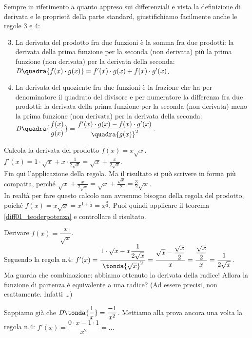 Sempre in riferimento a quanto appreso sui differenziali 
e vista la definizione di derivata e le proprietà della parte standard, 
giustifichiamo facilmente anche le regole 3 e 4:
\begin{enumerate}[noitemsep]
\setcounter{enumi}{2}
\item La derivata del prodotto fra due funzioni è la somma fra due prodotti:
la derivata della prima funzione per la seconda (non derivata) più la prima 
funzione (non derivata) per la derivata della seconda:\\
$\mathit{D}\quadra{f(x)\cdot g(x)}=f'(x)\cdot g(x)+f(x)\cdot g'(x)$.
\item La derivata del quoziente fra due funzioni è la frazione che ha per 
denominatore il quadrato del divisore e per numeratore la differenza fra due
prodotti: la derivata della prima funzione per la seconda (non derivata) meno
la prima funzione (non derivata) per la derivata della seconda:\\
$\mathit{D}\quadra{\dfrac{f(x)}{g(x)}}=\dfrac{f'(x)\cdot g(x)-f(x)\cdot g'(x)}
  {\quadra{g(x)}^2}$.
\end{enumerate} 

\begin{esempio}
  Calcola la derivata del prodotto $f(x)=x\sqrt{x}$.\\
  $f'(x)=1\cdot \sqrt{x}+x\cdot\frac{1}{2\sqrt{x}}=
  \sqrt{x}+\frac{x}{2\sqrt{x}}$.\\
  Fin qui l'applicazione della regola. Ma il risultato si può scrivere 
  in forma più compatta, perché $\sqrt{x}+\frac{x}{2\sqrt{x}}=
  \sqrt{x}+\frac{\sqrt{x}}{2}=\frac{3}{2}\sqrt{x}$.\\
  In realtà per fare questo calcolo non avremmo bisogno della regola del 
  prodotto, poiché $f(x)=x\sqrt{x}=x^{1+\frac{1}{2}}=x^{\frac{3}{2}}$. Puoi 
  quindi applicare il teorema \ref{diff01_teoderpotenza} e controllare il 
  risultato.
\end{esempio}

\begin{esempio}
  Derivare $f(x)=\dfrac{x}{\sqrt{x}}$.\\
  Seguendo la regola n.4: $f'(x)= \dfrac{1\cdot\sqrt{x}-x\dfrac{1}{2\sqrt{x}}}
  {\tonda{\sqrt{x}}^2}=\dfrac{\sqrt{x}-\dfrac{\sqrt{x}}{2}}{x}=
  \dfrac{\dfrac{\sqrt{x}}{2}}{x}=\dfrac{1}{2\sqrt{x}}$.\\
  Ma guarda che combinazione: abbiamo ottenuto la derivata della radice! Allora 
  la funzione di partenza è equivalente a una radice? (Ad essere precisi, non 
  esattamente. Infatti \dots)
\end{esempio}
\begin{esempio}
  Sappiamo già che $\mathit{D}\tonda{\dfrac{1}{x}}=\dfrac{-1}{x^2}$. Mettiamo 
  alla prova ancora una volta la regola n.4: $f'(x)=\dfrac{0\cdot x-1\cdot 1}
  {x^2}= \dots$
\end{esempio}

